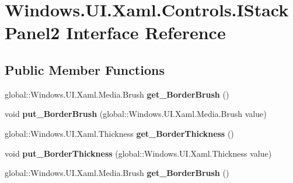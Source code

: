 \hypertarget{interface_windows_1_1_u_i_1_1_xaml_1_1_controls_1_1_i_stack_panel2}{}\section{Windows.\+U\+I.\+Xaml.\+Controls.\+I\+Stack\+Panel2 Interface Reference}
\label{interface_windows_1_1_u_i_1_1_xaml_1_1_controls_1_1_i_stack_panel2}
\subsection*{Public Member Functions}
\begin{DoxyCompactItemize}
\item 
\mbox{\label{interface_windows_1_1_u_i_1_1_xaml_1_1_controls_1_1_i_stack_panel2_a10338f92faf84217b61660cdff15501f}} 
global\+::\+Windows.\+U\+I.\+Xaml.\+Media.\+Brush {\bfseries get\+\_\+\+Border\+Brush} ()
\item 
\mbox{\label{interface_windows_1_1_u_i_1_1_xaml_1_1_controls_1_1_i_stack_panel2_ae6c67abfd4b96b9db52ac7024e143420}} 
void {\bfseries put\+\_\+\+Border\+Brush} (global\+::\+Windows.\+U\+I.\+Xaml.\+Media.\+Brush value)
\item 
\mbox{\label{interface_windows_1_1_u_i_1_1_xaml_1_1_controls_1_1_i_stack_panel2_ae09be2dac045dee9ffca344ee32050f2}} 
global\+::\+Windows.\+U\+I.\+Xaml.\+Thickness {\bfseries get\+\_\+\+Border\+Thickness} ()
\item 
\mbox{\label{interface_windows_1_1_u_i_1_1_xaml_1_1_controls_1_1_i_stack_panel2_a8a840e0862f27b4941c7f920b2986255}} 
void {\bfseries put\+\_\+\+Border\+Thickness} (global\+::\+Windows.\+U\+I.\+Xaml.\+Thickness value)
\item 
\mbox{\label{interface_windows_1_1_u_i_1_1_xaml_1_1_controls_1_1_i_stack_panel2_a10338f92faf84217b61660cdff15501f}} 
global\+::\+Windows.\+U\+I.\+Xaml.\+Media.\+Brush {\bfseries get\+\_\+\+Border\+Brush} ()

\end{DoxyCompactItemize}
